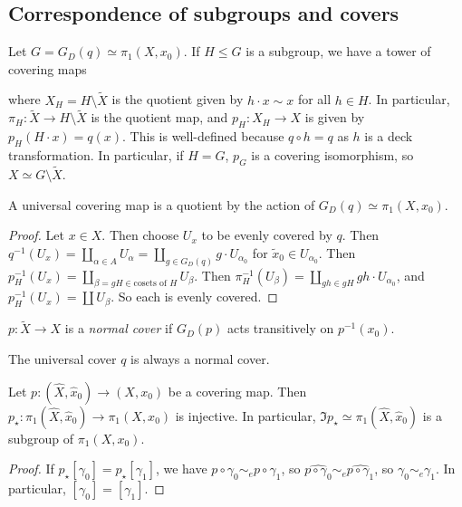 \subsection{Correspondence of subgroups and covers}
\begin{proposition}
	Let \( G = G_D(q) \simeq \pi_1(X, x_0) \).
	If \( H \leq G \) is a subgroup, we have a tower of covering maps
	\begin{center}
	\end{center}
	where \( X_H = H \setminus \widetilde X \) is the quotient given by \( h \cdot x \sim x \) for all \( h \in H \).
	In particular, \( \pi_H \colon \widetilde X \to H \setminus \widetilde X \) is the quotient map, and \( p_H \colon X_H \to X \) is given by \( p_H(H \cdot x) = q(x) \).
	This is well-defined because \( q \circ h = q \) as \( h \) is a deck transformation.
	In particular, if \( H = G \), \( p_G \) is a covering isomorphism, so \( X \simeq G \setminus \widetilde X \).
\end{proposition}
A universal covering map is a quotient by the action of \( G_D(q) \simeq \pi_1(X,x_0) \).
\begin{proof}
	Let \( x \in X \).
	Then choose \( U_x \) to be evenly covered by \( q \).
	Then \( q^{-1}(U_x) = \coprod_{\alpha \in A} U_\alpha = \coprod_{g \in G_D(q)} g \cdot U_{\alpha_0} \) for \( \widetilde x_0 \in U_{\alpha_0} \).
	Then \( p_H^{-1}(U_x) = \coprod_{\beta = gH \in \text{cosets of } H} U_\beta \).
	Then \( \pi_H^{-1}(U_\beta) = \coprod_{gh \in gH} gh \cdot U_{\alpha_0} \), and \( p_H^{-1}(U_x) = \coprod U_\beta \).
	So each is evenly covered.
\end{proof}
\begin{definition}
	\( p \colon \widetilde X \to X \) is a \emph{normal cover} if \( G_D(p) \) acts transitively on \( p^{-1}(x_0) \).
\end{definition}
\begin{example}
	The universal cover \( q \) is always a normal cover.
\end{example}
\begin{proposition}
	Let \( p \colon (\hat X, \hat x_0) \to (X, x_0) \) be a covering map.
	Then \( p_\star \colon \pi_1(\hat X, \hat x_0) \to \pi_1(X, x_0) \) is injective.
	In particular, \( \Im p_\star \simeq \pi_1(\hat X, \hat x_0) \) is a subgroup of \( \pi_1(X, x_0) \).
\end{proposition}
\begin{proof}
	If \( p_\star[\gamma_0] = p_\star[\gamma_1] \), we have \( p \circ \gamma_0 \sim_e p \circ \gamma_1 \), so \( \widehat{p \circ \gamma_0} \sim_e \widehat{p \circ \gamma_1} \), so \( \gamma_0 \sim_e \gamma_1 \).
	In particular, \( [\gamma_0] = [\gamma_1] \).
\end{proof}

